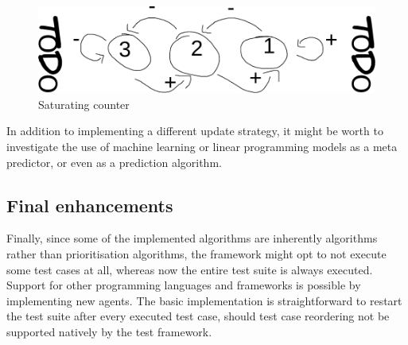 \begin{figure}[htbp!]
	\centering
	\includegraphics[width=\textwidth]{assets/images/saturating-counter.pdf}
	\caption{Saturating counter}
	\label{fig:saturating-counter}
\end{figure}

In addition to implementing a different update strategy, it might be worth to investigate the use of machine learning or linear programming models as a meta predictor, or even as a prediction algorithm.

\subsection{Final enhancements}
Finally, since some of the implemented algorithms are inherently \tsm{} algorithms rather than prioritisation algorithms, the framework might opt to not execute some test cases at all, whereas now the entire test suite is always executed.\\

\noindent Support for other programming languages and frameworks is possible by implementing new agents. The basic implementation is straightforward to restart the test suite after every executed test case, should test case reordering not be supported natively by the test framework.